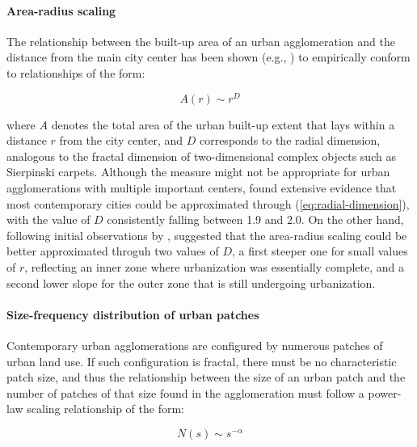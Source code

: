 \paragraph*{Area-radius scaling} \hspace{0cm} %

The relationship between the built-up area of an urban agglomeration and the distance from the main city center has been shown (e.g., \cite{frankhauser1994fractalite}) to empirically conform to relationships of the form:

\begin{equation}
  \label{eq:radial-dimension}
  A(r) \sim r^D
\end{equation}

where $A$ denotes the total area of the urban built-up extent that lays within a distance $r$ from the city center, and $D$ corresponds to the radial dimension, analogous to the fractal dimension of two-dimensional complex objects such as Sierpinski carpets.
Although the measure might not be appropriate for urban agglomerations with multiple important centers, \cite{frankhauser1994fractalite} found extensive evidence that most contemporary cities could be approximated through (\ref{eq:radial-dimension}), with the value of $D$ consistently falling between 1.9 and 2.0.
On the other hand, following initial observations by \cite{frankhauser1990aspects}, \cite{white1993cellular} suggested that the area-radius scaling could be better approximated throguh two values of $D$, a first steeper one for small values of $r$, reflecting an inner zone where urbanization was essentially complete, and a second lower slope for the outer zone that is still undergoing urbanization.

\paragraph*{Size-frequency distribution of urban patches} \hspace{0cm} %

Contemporary urban agglomerations are configured by numerous patches of urban land use.
If such configuration is fractal, there must be no characteristic patch size, and thus the relationship between the size of an urban patch and the number of patches of that size found in the agglomeration must follow a power-law scaling relationship of the form:

\begin{equation}
  \label{eq:size-frequency}
  N(s) \sim s^{-\alpha}
\end{equation}

